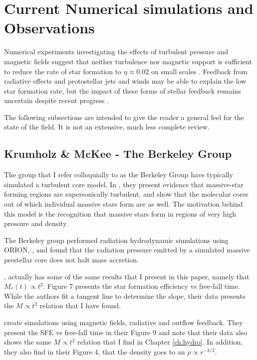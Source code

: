 \documentclass[../dissertation.tex]{subfiles}
\begin{document}
\section{Current Numerical simulations and Observations} \label{current_obs}
Numerical experiments investigating the effects of turbulent pressure and magnetic fields suggest that neither turbulence nor magnetic support is sufficient 
to reduce the rate of star formation to $\eta\approx 0.02$ on small scales
\citep{2010ApJ...709...27W,2011MNRAS.410L...8C,2011ApJ...730...40P,2012ApJ...754...71K,2014MNRAS.439.3420M}. 
Feedback from radiative effects and protostellar jets and winds may be able to explain the low star formation rate, 
but the impact of these forms of stellar feedback remains uncertain despite recent progress
\citep{2010ApJ...709...27W,2014MNRAS.439.3420M,2015MNRAS.450.4035F}.

The following subsections are intended to give the reader a general feel for the state of the field. 
It is not an extensive, much less complete review.

\subsection{Krumholz \& McKee - The Berkeley Group}
The group that I refer colloquially to as the Berkeley Group have typically simulated a turbulent core model.
In \citet{2003ApJ...585..850M}, they present evidence that massive-star forming regions are supersonically turbulent, 
and show that the molecular cores out of which individual massive stars form are as well.
The motivation behind this model is the recognition that massive stars form in regions of very high pressure and density.

The Berkeley group performed radiation hydrodynamic simulations using ORION,
\citep{2009Sci...323..754K}, and found that the radiation pressure emitted by a simulated massive prestellar core does not halt mass accretion. 

\citet{2014MNRAS.439.3420M}, actually has some of the same results that I present in this paper, namely that $M_*(t) \propto t^2$. 
Figure 7 presents the star formation efficiency vs free-fall time. While the authors fit a tangent line to determine the slope, their data presents the $M \propto t^2$ relation that I have found. 

\citet{2018MNRAS.473.4220L} create simulations using magnetic fields, radiative and outflow feedback. 
They present the SFE vs free-fall time in their Figure 9 and note that their data also shows the same $M \propto t^2$ relation that I find in Chapter \ref{ch:hydro}. 
In addition, they also find in their Figure 4, that the density goes to an $\rho \propto r^{-3/2}$.
\end{document}
